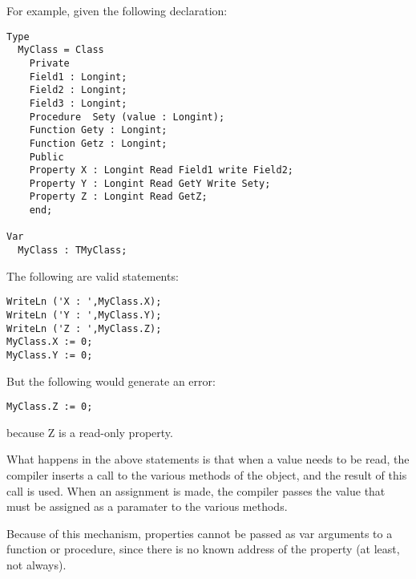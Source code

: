 For example, given the following declaration:
\begin{verbatim}
Type
  MyClass = Class
    Private
    Field1 : Longint;
    Field2 : Longint;
    Field3 : Longint;
    Procedure  Sety (value : Longint);
    Function Gety : Longint;
    Function Getz : Longint;
    Public
    Property X : Longint Read Field1 write Field2;
    Property Y : Longint Read GetY Write Sety;
    Property Z : Longint Read GetZ;
    end;

Var 
  MyClass : TMyClass;
\end{verbatim}
The following are valid statements:
\begin{verbatim}
WriteLn ('X : ',MyClass.X);
WriteLn ('Y : ',MyClass.Y);
WriteLn ('Z : ',MyClass.Z);
MyClass.X := 0;
MyClass.Y := 0;
\end{verbatim}
But the following would generate an error:
\begin{verbatim}
MyClass.Z := 0;
\end{verbatim}
because Z is a read-only property.

What happens in the above statements is that when a value needs to be read,
the compiler inserts a call to the various  methods of the
object, and the result of this call is used. When an assignment is made,
the compiler passes the value that must be assigned as a paramater to
the various  methods.

Because of this mechanism, properties cannot be passed as var arguments to a
function or procedure, since there is no known address of the property (at
least, not always).

